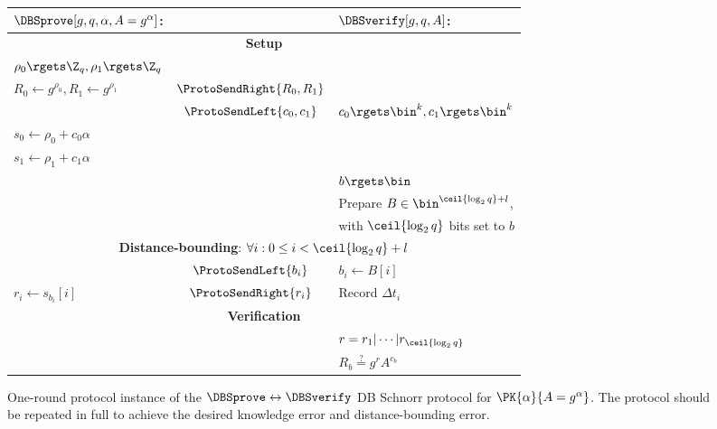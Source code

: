 \begin{figure*}
  \centering
  \begin{tabular}{lcl}
    \(\DBSprove[g, q, \alpha, A = g^\alpha]\):
    & &
    \(\DBSverify[g, q, A]\):
    \\
    \midrule

    \multicolumn{3}{c}{\textbf{Setup}} \\

    \(\rho_0\rgets \Z_q, \rho_1\rgets \Z_q\)
    &
    &
    \\

    \(R_0\gets g^{\rho_0}, R_1\gets g^{\rho_1}\)
    & \(\ProtoSendRight{R_0, R_1}\)
    &
    \\

    & \(\ProtoSendLeft{c_0, c_1}\)
    & \(c_0\rgets \bin^k, c_1\rgets \bin^k\)
    \\

    \(s_0\gets \rho_0 + c_0\alpha\)
    &
    &
    \\

    \(s_1\gets \rho_1 + c_1\alpha\)
    &
    &
    \\

    &
    & \(b\rgets \bin\)
    \\

    &
    & Prepare \(B\in \bin^{\ceil{\log_2 q}+l}\),
    \\

    &
    & with \(\ceil{\log_2 q}\) bits set to \(b\)
    \\

    \midrule
    \multicolumn{3}{c}{\textbf{Distance-bounding}: \(\forall i: 0\leq i < 
        \ceil{\log_2 q} + l\)} \\


    & \(\ProtoSendLeft{b_i}\)
    & \(b_i\gets B[i]\)
    \\

    \(r_i\gets s_{b_i}[i]\)
    & \(\ProtoSendRight{r_i}\)
    & Record \(\Delta t_i\)
    \\

    \midrule
    \multicolumn{3}{c}{\textbf{Verification}}
    \\

    &
    & \(r = r_1|\dotsb|r_{\ceil{\log_2 q}}\)
    \\

    &
    & \(R_b \stackrel{?}{=} g^r A^{c_b}\)
    \\
    
  \end{tabular}
  \caption{%
    One-round protocol instance of the \(\DBSprove\leftrightarrow \DBSverify\) 
    \ac{DB} Schnorr protocol for \(\PK{\alpha}{A = g^\alpha}\).
    The protocol should be repeated in full to achieve the desired knowledge 
    error and distance-bounding error.
  }%
  \label{SchnorrFigure}
\end{figure*}

